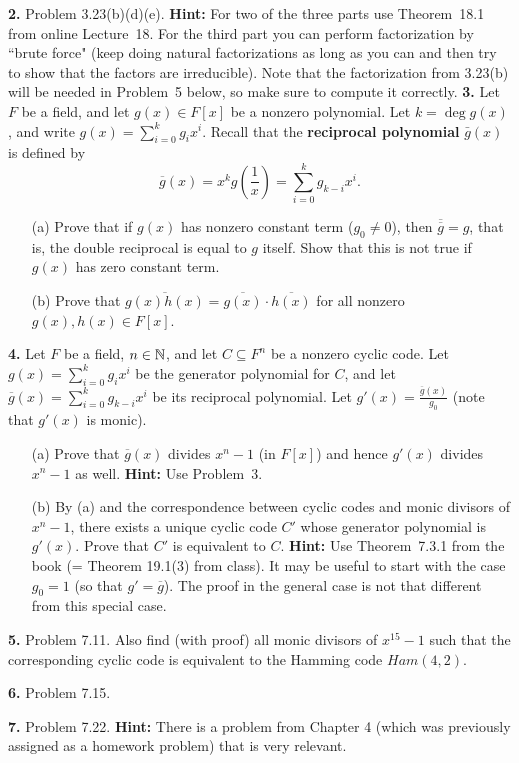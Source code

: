 \documentclass[12pt]{amsart}
\begin{document}
\skv
{\bf 2.} Problem 3.23(b)(d)(e). {\bf Hint:} For two of the three parts use Theorem~18.1 from online Lecture~18. For the third part you can perform factorization by ``brute force" (keep doing natural factorizations as long as you can and then try to show that the factors are irreducible). Note that the factorization from 3.23(b) will be needed in Problem~5 below, so make sure to compute it correctly.
\skv
\skv
{\bf 3.} Let $F$ be a field, and let $g(x)\in F[x]$ be a nonzero polynomial.  Let
$k=\deg g(x)$, and write $g(x)=\sum_{i=0}^k g_i x^i$. Recall that the {\bf reciprocal polynomial} $\bar g(x)$ is defined by 
$${\overline g}(x)=x^k g\left(\frac{1}{x}\right)=\sum_{i=0}^k g_{k-i} x^i.$$ 
\begin{itemize}
\item[(a)] Prove that if $g(x)$ has nonzero constant term ($g_0\neq 0$), then $\overline{{\overline g}}=g$, that is, the double
reciprocal is equal to $g$ itself. Show that this is not true if $g(x)$ has zero constant term.
\item[(b)] Prove that $\overline{g(x) h(x)}=\overline{g(x)}\cdot \overline{h(x)}$ for all nonzero $g(x),h(x)\in F[x]$.
\end{itemize}
\skv
{\bf 4.} Let $F$ be a field, $n\in{\mathbb N}$, and let $C\subseteq F^n$ be a nonzero cyclic code. 
Let $g(x)=\sum_{i=0}^k g_i x^i$ be the generator polynomial for $C$, and let
${\overline g}(x)=\sum\limits_{i=0}^k g_{k-i} x^i$ be its reciprocal polynomial. 
Let $g'(x)=\frac{{\overline g}(x)}{g_0}$ (note that $g'(x)$ is monic).
\begin{itemize}
\item[(a)] Prove that $\overline g(x)$ divides $x^n-1$ (in $F[x]$) and hence $g'(x)$ divides $x^n-1$ as well. {\bf Hint:} Use Problem~3.
\item[(b)] By (a) and the correspondence between cyclic codes and monic divisors of $x^n-1$, there exists a unique cyclic code $C'$
whose generator polynomial is $g'(x)$. Prove that $C'$ is equivalent to $C$.  {\bf Hint:} Use Theorem~7.3.1 from the book (= Theorem 19.1(3)
from class). It may be useful to start with the case $g_0=1$ (so that $g'=\overline g$). The proof in the general case is not that different from this special case. 
\end{itemize}
\skv

{\bf 5.} Problem 7.11. Also find (with proof) all monic divisors of $x^{15}-1$ such that the corresponding cyclic code is equivalent to the Hamming code $Ham(4,2)$.
\skv
\skv

{\bf 6.} Problem 7.15.
\skv
\skv


{\bf 7.} Problem 7.22. {\bf Hint:} There is a problem from Chapter 4 (which was previously assigned as a homework problem) that is very relevant.
\end{document}
